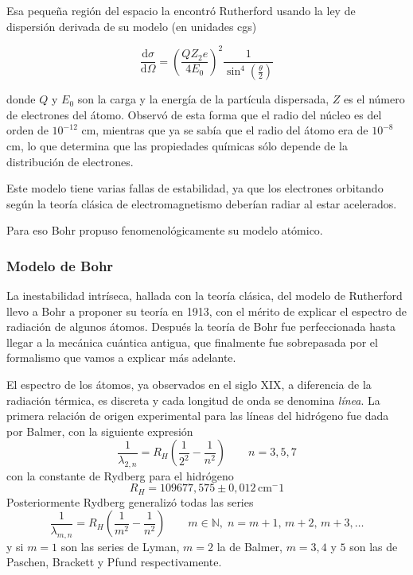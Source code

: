 Esa pequeña región del espacio la encontró Rutherford usando la ley de dispersión derivada de su modelo (en unidades cgs)

\begin{equation}
 \frac{\mathrm{d}\sigma}{\mathrm{d}\Omega} = \left(\frac{Q Z_2 e}{4 E_0}\right)^2 \frac{1}{\sin^4\left(\frac{\theta}{2} \right)}
\end{equation}

donde $Q$ y $E_0$ son la carga y la energía de la partícula dispersada, $Z$ es el número de electrones del átomo.
Observó de esta forma que el radio del núcleo es del orden de $10^{-12}$ cm, mientras que ya se sabía que el radio del átomo era de $10^{-8}$ cm, lo que determina que las propiedades químicas sólo depende de la distribución de electrones.

Este modelo tiene varias fallas de estabilidad, ya que los electrones orbitando según la teoría clásica de electromagnetismo deberían radiar al estar acelerados.

Para eso Bohr propuso fenomenológicamente su modelo atómico.

\subsubsection{Modelo de Bohr}

La inestabilidad intríseca, hallada con la teoría clásica, del modelo de Rutherford llevo a Bohr a proponer su teoría en 1913, con el mérito de explicar el espectro de radiación de algunos átomos.
Después la teoría de Bohr fue perfeccionada hasta llegar a la mecánica cuántica antigua, que finalmente fue sobrepasada por el formalismo que vamos a explicar más adelante.

El espectro de los átomos, ya observados en el siglo XIX, a diferencia de la radiación térmica, es discreta y cada longitud de onda se denomina \emph{línea}.
La primera relación de origen experimental para las líneas del hidrógeno fue dada por Balmer, con la siguiente expresión
\begin{equation}
    \frac{1}{\lambda_{2,n}} = R_H \left(\frac{1}{2^2} - \frac{1}{n^2}\right) \qquad n = 3, 5, 7
\end{equation}
con la constante de Rydberg para el hidrógeno 
\begin{equation}
    R_H = 109677,575\pm0,012 \,\text{cm}^-1
\end{equation}
Posteriormente Rydberg generalizó todas las series
\begin{equation}
    \frac{1}{\lambda_{m,n}} = R_H \left(\frac{1}{m^2} - \frac{1}{n^2}\right) \qquad m \in \mathbb{N},\; n = m + 1,\,m + 2,\,m + 3,\dots
\end{equation}
y si $m = 1$ son las series de Lyman, $m = 2$ la de Balmer, $m = 3, 4$ y $5$ son las de Paschen, Brackett y Pfund respectivamente.

